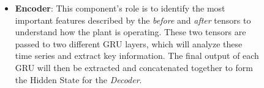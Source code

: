 \begin{figure}[H]
\begin{minipage}{0.6\textwidth}
\begin{itemize}
			\item \textbf{Encoder}: This component's role is to identify the most important features described by the \textit{before} and \textit{after} tensors to understand how the plant is operating. These two tensors are passed to two different GRU\cite{gru2} layers, which will analyze these time series and extract key information. The final output of each GRU will then be extracted and concatenated together to form the Hidden State for the \textit{Decoder}.
		\end{itemize}
	\end{minipage}%
	\hspace{0.5cm}
	\begin{minipage}{0.4\textwidth}
		\centering

\end{minipage}
\end{figure}
